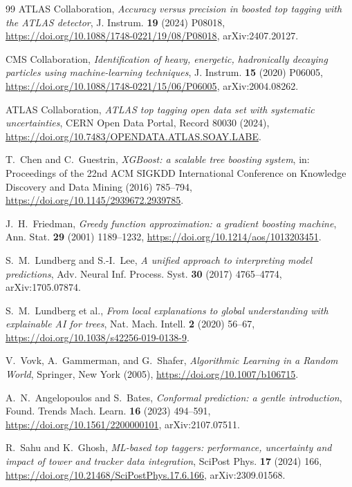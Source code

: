 \documentclass[pdflatex,sn-mathphys,Numbered,iicol]{sn-jnl}
\begin{document}
\begin{thebibliography}{99}
ATLAS Collaboration,
\emph{Accuracy versus precision in boosted top tagging with the ATLAS detector},
J. Instrum. \textbf{19} (2024) P08018,
\url{https://doi.org/10.1088/1748-0221/19/08/P08018},
arXiv:2407.20127.

CMS Collaboration,
\emph{Identification of heavy, energetic, hadronically decaying particles using
machine-learning techniques},
J. Instrum. \textbf{15} (2020) P06005,
\url{https://doi.org/10.1088/1748-0221/15/06/P06005},
arXiv:2004.08262.

ATLAS Collaboration,
\emph{ATLAS top tagging open data set with systematic uncertainties},
CERN Open Data Portal, Record 80030 (2024),
\url{https://doi.org/10.7483/OPENDATA.ATLAS.SOAY.LABE}.

T.~Chen and C.~Guestrin,
\emph{XGBoost: a scalable tree boosting system},
in: Proceedings of the 22nd ACM SIGKDD International Conference on Knowledge Discovery
and Data Mining (2016) 785--794,
\url{https://doi.org/10.1145/2939672.2939785}.

J.~H.~Friedman,
\emph{Greedy function approximation: a gradient boosting machine},
Ann. Stat. \textbf{29} (2001) 1189--1232,
\url{https://doi.org/10.1214/aos/1013203451}.

S.~M.~Lundberg and S.-I.~Lee,
\emph{A unified approach to interpreting model predictions},
Adv. Neural Inf. Process. Syst. \textbf{30} (2017) 4765--4774,
arXiv:1705.07874.

S.~M.~Lundberg et al.,
\emph{From local explanations to global understanding with explainable AI for trees},
Nat. Mach. Intell. \textbf{2} (2020) 56--67,
\url{https://doi.org/10.1038/s42256-019-0138-9}.

V.~Vovk, A.~Gammerman, and G.~Shafer,
\emph{Algorithmic Learning in a Random World},
Springer, New York (2005),
\url{https://doi.org/10.1007/b106715}.

A.~N.~Angelopoulos and S.~Bates,
\emph{Conformal prediction: a gentle introduction},
Found. Trends Mach. Learn. \textbf{16} (2023) 494--591,
\url{https://doi.org/10.1561/2200000101},
arXiv:2107.07511.

R.~Sahu and K.~Ghosh,
\emph{ML-based top taggers: performance, uncertainty and impact of tower and tracker
data integration},
SciPost Phys. \textbf{17} (2024) 166,
\url{https://doi.org/10.21468/SciPostPhys.17.6.166},
arXiv:2309.01568.


\end{thebibliography}
\end{document}
